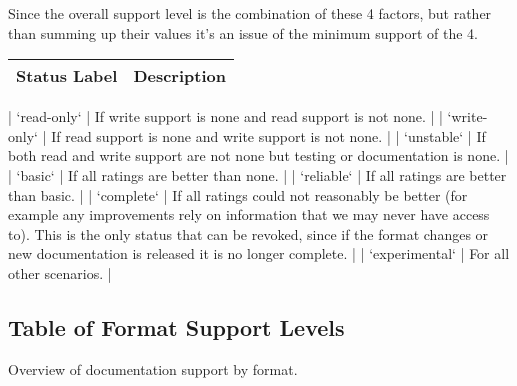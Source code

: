 Since the overall support level is the combination of these
4 factors, but rather than summing up their values it's an 
issue of the minimum support of the 4.

\begin{longtable}{l p{8cm}}
Status Label & Description \\
\hline
\end{longtable}

| `read-only` | If write support is none and read support is not none. |
| `write-only` | If read support is none and write support is not none. |
| `unstable` | If both read and write support are not none but testing or documentation is none. |
| `basic` | If all ratings are better than none. |
| `reliable` | If all ratings are better than basic. |
| `complete` | If all ratings could not reasonably be better (for example any improvements rely on information that we may never have access to). This is the only status that can be revoked, since if the format changes or new documentation is released it is no longer complete. |
| `experimental` | For all other scenarios. |

\subsection{Table of Format Support Levels}

Overview of documentation support by format.

